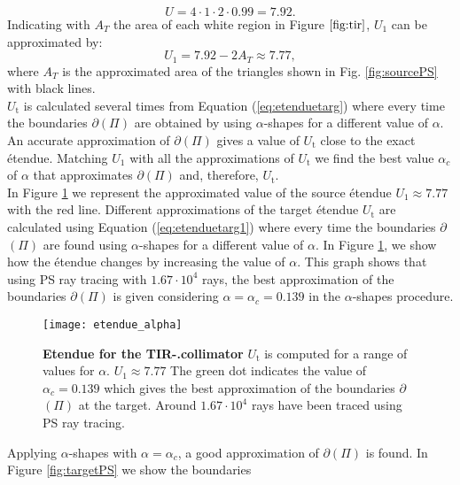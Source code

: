  \begin{equation}U = 4\cdot 1\cdot 2\cdot 0.99 = 7.92.\end{equation} Indicating with $A_{T}$ the area of each white region in Figure $\ref{fig:tir}$, $U_1$ can be approximated by:
 \begin{equation}\label{eq:Usource}
 U_{1} = 7.92-2A_{T}\approx 7.77,
 \end{equation}
 where $A_{T}$ is the approximated area of the triangles shown in Fig. \ref{fig:sourcePS} with black lines.\\ \indent  $U_{\textrm{t}}$ is calculated several times from Equation (\ref{eq:etenduetarg}) where every time the boundaries $\partial$$(\Pi)$ are obtained by using $\alpha$-shapes for a different value of $\alpha$. An accurate approximation of $\partial$$(\Pi)$ gives a value of $U_{\textrm{t}}$ close to the exact \'{e}tendue. 
Matching $U_1$ with all the approximations of $U_{\textrm{t}}$ we find the best value $\alpha_c$ of $\alpha$ that approximates $\partial$$(\Pi)$ and, therefore, $U_{\textrm{t}}$. \\ \indent In Figure \ref{fig:etendueTS} we represent the approximated value of the source \'{e}tendue $U_1\approx 7.77$ with the red line. Different approximations of the target \'{e}tendue $U_{\textrm{t}}$ are calculated using Equation (\ref{eq:etenduetarg1}) where every time the boundaries $\partial$$(\Pi)$ are found using $\alpha$-shapes for a different value of $\alpha$. In Figure \ref{fig:etendueTS}, we show how the \'{e}tendue changes by increasing the value of $\alpha$. This graph shows that using PS ray tracing with $1.67\cdot 10^4$ rays, the best approximation of the boundaries $\partial$$(\Pi)$ is given considering $\alpha = \alpha_c = 0.139$ in the $\alpha$-shapes procedure.
 \begin{figure}[h]
  \begin{center}
  \texttt{[image: etendue\_alpha]}
  \end{center}
  \caption{\textbf{Etendue for the TIR-.collimator}
  $U_\textrm{t}$ is computed for a range of values for $\alpha$. $U_1 \approx 7.77$
   The green dot indicates the value of $\alpha_c = 0.139$ which gives the best approximation of the boundaries $\partial$$(\Pi)$ at the target.
   Around $1.67 \cdot 10^4$ rays have been traced using PS ray tracing.
  }
  \label{fig:etendueTS}
\end{figure}
Applying $\alpha$-shapes with $\alpha=\alpha_c$, a good approximation of $\partial$$(\Pi)$ is found. In Figure \ref{fig:targetPS} we show the boundaries 
